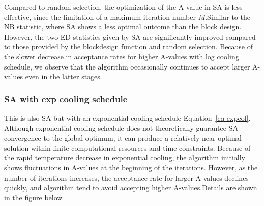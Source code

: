 \documentclass[
  a4paper,
  oneside,
  openany,
  12pt,
  onecolumn]{book}
\theoremstyle{plain}
\theoremstyle{definition}
\theoremstyle{remark}
\begin{document}
Compared to random selection, the optimization of the A-value in SA is
less effective, since the limitation of a maximum iteration number
\(M\).Similar to the NB statistic, where SA shows a less optimal outcome
than the block design. However, the two ED statistics given by SA are
significantly improved compared to those provided by the blockdesign
function and random selection. Because of the slower decrease in
acceptance rates for higher A-values with log cooling schedule, we
observe that the algorithm occasionally continues to accept larger
A-values even in the latter stages.

\subsubsection{SA with exp cooling
schedule}\label{sa-with-exp-cooling-schedule}

This is also SA but with an exponential cooling schedule
Equation~\ref{eq-expcol}. Although exponential cooling schedule does not
theoretically guarantee SA convergence to the global optimum, it can
produce a relatively near-optimal solution within finite computational
resources and time constraints. Because of the rapid temperature
decrease in exponential cooling, the algorithm initially shows
fluctuations in A-values at the beginning of the iterations. However, as
the number of iterations increases, the acceptance rate for larger
A-values declines quickly, and algorithm tend to avoid accepting higher
A-values.Details are shown in the figure below

\begin{figure}


\caption{\label{fig-align}}

\end{figure}%
\end{document}
